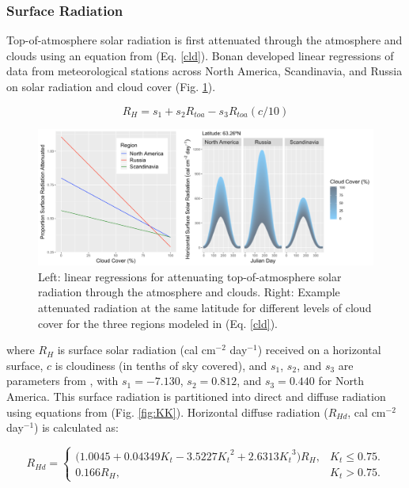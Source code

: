 \documentclass[a4paper, 12pt] {report}
\begin{document}
\subsubsection{Surface Radiation}
Top-of-atmosphere solar radiation is first attenuated through the atmosphere and clouds using an equation from  (Eq. \ref{cld}). Bonan developed linear regressions of data from meteorological stations across North America, Scandinavia, and Russia on solar radiation and cloud cover (Fig. \ref{fig:cld_eq}).

\begin{equation} \label{cld}
R_{H} = s_1 + s_2R_{toa} - s_3R_{toa}(c/10)
\end{equation}

\begin{figure}
  \includegraphics[width=\linewidth]{Figures/Cloud_Cover.png}
  \caption{Left: linear regressions for attenuating top-of-atmosphere solar radiation through the atmosphere and clouds. Right: Example attenuated radiation at the same latitude for different levels of cloud cover for the three regions modeled in \protect{} (Eq. \ref{cld}).}
  \label{fig:cld_eq}
\end{figure}

where $R_H$ is surface solar radiation (cal cm$^{-2}$ day$^{-1}$) received on a horizontal surface, $c$ is cloudiness (in tenths of sky covered), and $s_1$, $s_2$, and $s_3$ are parameters from , with $s_1 = -7.130$, $s_2 = 0.812$, and $s_3 = 0.440$ for North America. This surface radiation is partitioned into direct and diffuse radiation using equations from  (Fig. \ref{fig:KK}). Horizontal diffuse radiation ($R_{Hd}$, cal cm$^{-2}$ day$^{-1}$) is calculated as:

\begin{equation} \label{kk}
R_{Hd}=\begin{cases}
	\Big(1.0045 + 0.04349K_t - 3.5227{K_t}^2 + 2.6313{K_t}^3\Big)R_H, & \text{$K_t \leq 0.75$}.\\
	0.166R_H, & \text{$K_t > 0.75$}.
  \end{cases}
\end{equation}
\end{document}
